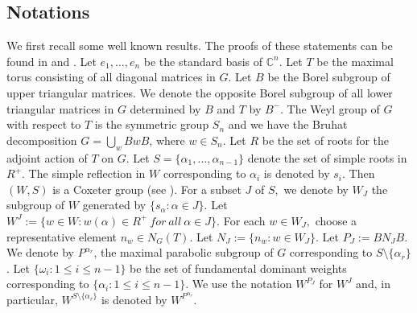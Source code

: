 \subsection{Notations}
\label{sec:notations}
We first recall some well known results.   The proofs of these statements can be found in \cite{lakshmibai2007standard} and \cite{seshadriintroduction}. 
Let $e_1,\ldots,e_n$ be the standard basis of ${\mathbb C}^n$. 
Let $T$ be the maximal torus consisting of all diagonal matrices in $G$. Let $B$ be the Borel subgroup of upper triangular matrices. We denote the opposite  Borel subgroup of all lower triangular matrices in $G$ determined by $B$ and $T$ by $B^{-}$. The Weyl group of $G$ with respect to $T$ is the symmetric group $S_n$  and we have the Bruhat decomposition $G = \bigcup_w BwB$, where $w \in S_n$. Let $R$ be the set of roots for the adjoint action of $T$ on $G$. Let $S = \{\alpha_1,\ldots,\alpha_{n-1}\}$ denote the set of simple roots in $R^{+}.$ 
The simple reflection in  $W$ corresponding to $\alpha_i$ is denoted
by $s_{i}$. Then $(W, S)$ is a Coxeter group (see \cite[Theorem 29.4, p.180]{hum1975linearalggroups}). For a subset $J$ of $S,$ we denote by $W_{J}$ the subgroup of $W$ generated by $\{s_{\alpha}:\alpha \in J\}$. Let $W^{J}:=\{w\in W: w(\alpha)\in R^{+}~ for ~ all ~ \alpha \in J\}.$  For each $w\in W_{J},$ choose a representative element $n_{w}\in N_{G}(T).$ Let $N_{J}:=\{n_{w}: w\in W_{J}\}.$  Let $P_{J}:=BN_{J}B.$ We denote by $P^{\alpha_{r}}$, the maximal parabolic subgroup of $G$ corresponding to $S\setminus \{\alpha_r\}$.  Let  $\{\omega_{i}:1\le i\le n-1\}$ be the set of fundamental dominant weights corresponding to $\{\alpha_{i}: 1\le i\le n-1\}.$  We use the notation $W^{P_J}$ for $W^J$ and, in particular,
	$W^{S \setminus \{\alpha_r\}}$ is denoted by $W^{P^{\alpha_r}}$.
	
